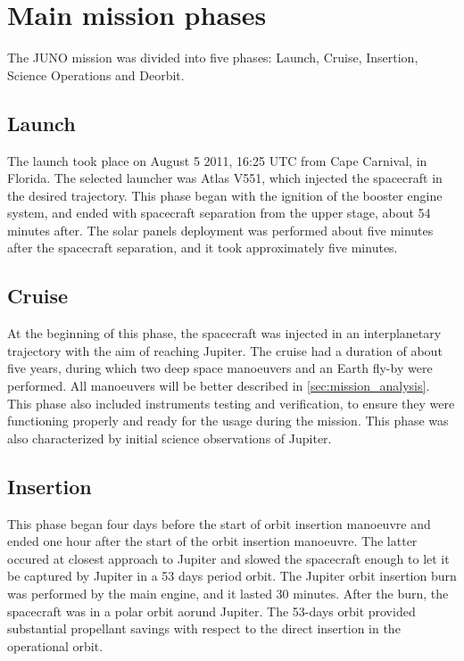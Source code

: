 \section{Main mission phases}
\label{sec:phases}

The JUNO mission was divided into five phases: Launch, Cruise, Insertion, Science Operations and Deorbit.

\subsection{Launch}
The launch took place on August 5 2011, 16:25 UTC from Cape Carnival, in Florida. The selected launcher was Atlas V551, which injected the spacecraft in the desired trajectory.
This phase began with the ignition of the booster engine system, and ended with spacecraft separation from the upper stage, about 54 minutes after. The solar panels deployment was performed about five minutes after the spacecraft separation, and it took approximately five minutes.

\subsection{Cruise}
At the beginning of this phase, the spacecraft was injected in an interplanetary trajectory with the aim of reaching Jupiter. The cruise had a duration of about five years, during which two deep space manoeuvers and an Earth fly-by were performed.
All manoeuvers will be better described in \autoref{sec:mission_analysis}. This phase also included instruments testing and verification, to ensure they were functioning properly and ready for the usage during the mission. This phase was also characterized by initial science observations of Jupiter.

\subsection{Insertion}
This phase began four days before the start of orbit insertion manoeuvre and ended one hour after the start of the orbit insertion manoeuvre. The latter occured at closest approach to Jupiter and slowed the spacecraft enough to let it be captured by Jupiter in a 53 days period orbit.
The Jupiter orbit insertion burn was performed by the main engine, and it lasted 30 minutes. After the burn, the spacecraft was in a polar orbit aorund Jupiter.
The 53-days orbit provided substantial propellant savings with respect to the direct insertion in the operational orbit.

